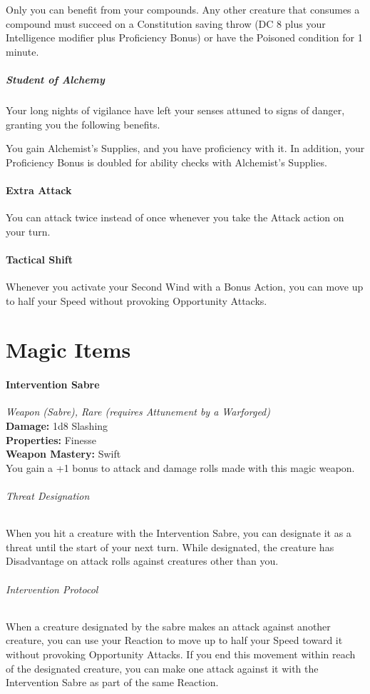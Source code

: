 \documentclass[letterpaper,openany,oneside,twocolumn]{book}
\begin{document}
Only you can benefit from your compounds. Any other creature that consumes a compound must succeed on a Constitution saving throw (DC 8 plus your Intelligence modifier plus Proficiency Bonus) or have the Poisoned condition for 1 minute.
\subsubsection*{Student of Alchemy}
Your long nights of vigilance have left your senses attuned to signs of danger, granting you the following benefits.

You gain Alchemist's Supplies, and you have proficiency with it. In addition, your Proficiency Bonus is doubled for ability checks with Alchemist's Supplies.\\
\subsection*{Extra Attack}
You can attack twice instead of once whenever you take the Attack action on your turn.
\subsection*{Tactical Shift}
Whenever you activate your Second Wind with a Bonus Action, you can move up to half your Speed without provoking Opportunity Attacks.

\part*{Magic Items}
\subsection*{Intervention Sabre}
\textit{Weapon (Sabre), Rare (requires Attunement by a Warforged)}\\
\textbf{Damage:} 1d8 Slashing\\
\textbf{Properties:} Finesse\\
\textbf{Weapon Mastery:} Swift\\
You gain a +1 bonus to attack and damage rolls made with this magic weapon.\\
\paragraph*{Threat Designation} When you hit a creature with the Intervention Sabre, you can designate it as a threat until the start of your next turn. While designated, the creature has Disadvantage on attack rolls against creatures other than you.\\
\paragraph*{Intervention Protocol} When a creature designated by the sabre makes an attack against another creature, you can use your Reaction to move up to half your Speed toward it without provoking Opportunity Attacks. If you end this movement within reach of the designated creature, you can make one attack against it with the Intervention Sabre as part of the same Reaction.
\end{document}
